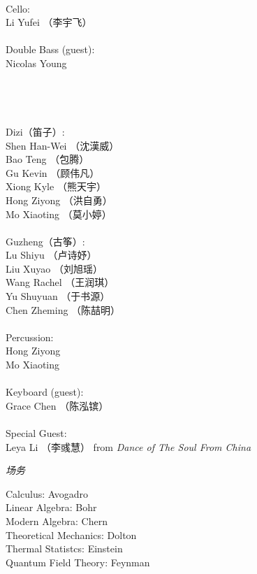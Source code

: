 \documentclass[letter,6pt,poets]{ConcProg}
\begin{document}
\begin{spacing}{1.0}
\begin{multicols}{2}
\\
Cello:\\
Li Yufei （李宇飞）\\
\\
Double Bass (guest):\\
Nicolas Young\\
\\
\\
\\
\\
Dizi（笛子）: 				 \\    
Shen Han-Wei		（沈漢威）     \\
Bao Teng  （包腾）\\
Gu Kevin   （顾伟凡）               \\
Xiong Kyle （熊天宇）\\
Hong Ziyong （洪自勇）\\
Mo Xiaoting （莫小婷）\\
\\
Guzheng（{古筝}）:\\
Lu Shiyu （卢诗妤）\\
Liu Xuyao  （刘旭瑶）\\               
Wang Rachel （王润琪） \\
Yu Shuyuan   （于书源）\\
Chen Zheming  （陈喆明）\\
\\
Percussion:\\
Hong Ziyong \\
Mo Xiaoting \\
\\
Keyboard (guest):\\
Grace Chen （陈泓镔）
\\
\\
Special Guest:\\
Leya Li （李彧慧）
 \footnotesize{ from } \emph{ Dance of The Soul From China}
\\
\end{multicols}
\begin{center}
\Large\textsl{ 场务}
\end{center}
\begin{multicols}{2}%
Calculus: Avogadro\\
Linear Algebra: Bohr\\
Modern Algebra: Chern\\
Theoretical Mechanics: Dolton\\
Thermal Statistcs: Einstein\\
Quantum Field Theory: Feynman




\end{multicols}
\end{spacing}
\end{document}
